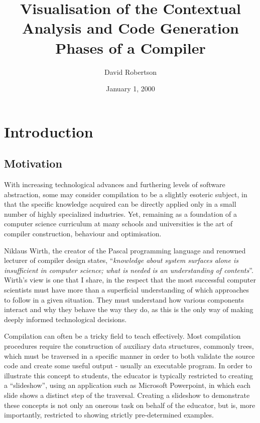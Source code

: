 \documentclass{l4proj}
\begin{document}
\title{Visualisation of the Contextual Analysis and Code Generation Phases of a Compiler}
\author{David Robertson}
\date{January 1, 2000}
\maketitle

\begin{abstract}

\end{abstract}

\educationalconsent
%
%
\tableofcontents

\chapter{Introduction}
\section{Motivation}
With increasing technological advances and furthering levels of software abstraction, some may consider compilation to be a slightly esoteric subject, in that the specific knowledge acquired can be directly applied only in a small number of highly specialized industries. Yet, remaining as a foundation of a computer science curriculum at many schools and universities is the art of compiler construction, behaviour and optimisation.

Niklaus Wirth, the creator of the Pascal programming language and renowned lecturer of compiler design states, ``\textit{knowledge about system surfaces alone is insufficient in computer science; what is needed is an understanding of contents}''. Wirth's view is one that I share, in the respect that the most successful computer scientists must have more than a superficial understanding of which approaches to follow in a given situation. They must understand how various components interact and why they behave the way they do, as this is the only way of making deeply informed technological decisions.

Compilation can often be a tricky field to teach effectively. Most compilation procedures require the construction of auxiliary data structures, commonly trees, which must be traversed in a specific manner in order to both validate the source code and create some useful output - usually an executable program. In order to illustrate this concept to students, the educator is typically restricted to creating a ``slideshow'', using an application such as Microsoft Powerpoint, in which each slide shows a distinct step of the traversal. Creating a slideshow to demonstrate these concepts is not only an onerous task on behalf of the educator, but is, more importantly, restricted to showing strictly pre-determined examples. 
\end{document}
